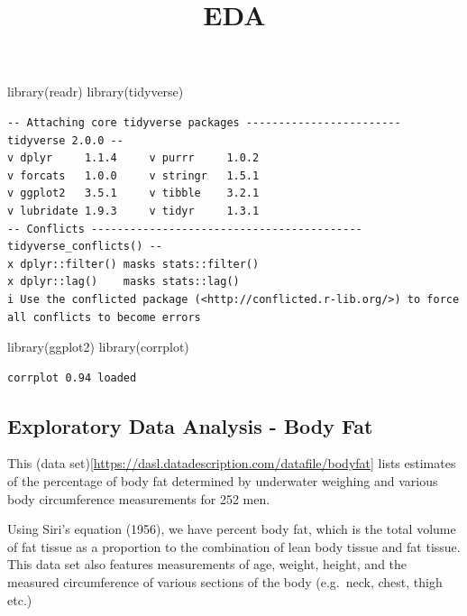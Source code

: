 \documentclass[
  letterpaper,
  DIV=11,
  numbers=noendperiod]{scrartcl}
\title{EDA}
\author{}
\date{}
\newenvironment{Shaded}{\begin{snugshade}}{\end{snugshade}}
\newcommand{\FunctionTok}[1]{\textcolor[rgb]{0.28,0.35,0.67}{#1}}
\newcommand{\NormalTok}[1]{\textcolor[rgb]{0.00,0.23,0.31}{#1}}
\begin{document}
\maketitle

\begin{Shaded}
\begin{Highlighting}[]
\FunctionTok{library}\NormalTok{(readr)}
\FunctionTok{library}\NormalTok{(tidyverse)}
\end{Highlighting}
\end{Shaded}

\begin{verbatim}
-- Attaching core tidyverse packages ------------------------ tidyverse 2.0.0 --
v dplyr     1.1.4     v purrr     1.0.2
v forcats   1.0.0     v stringr   1.5.1
v ggplot2   3.5.1     v tibble    3.2.1
v lubridate 1.9.3     v tidyr     1.3.1
-- Conflicts ------------------------------------------ tidyverse_conflicts() --
x dplyr::filter() masks stats::filter()
x dplyr::lag()    masks stats::lag()
i Use the conflicted package (<http://conflicted.r-lib.org/>) to force all conflicts to become errors
\end{verbatim}

\begin{Shaded}
\begin{Highlighting}[]
\FunctionTok{library}\NormalTok{(ggplot2)}
\FunctionTok{library}\NormalTok{(corrplot)}
\end{Highlighting}
\end{Shaded}

\begin{verbatim}
corrplot 0.94 loaded
\end{verbatim}

\subsection{Exploratory Data Analysis - Body
Fat}\label{exploratory-data-analysis---body-fat}

This (data
set){[}\url{https://dasl.datadescription.com/datafile/bodyfat}{]} lists
estimates of the percentage of body fat determined by underwater
weighing and various body circumference measurements for 252 men.

Using Siri's equation (1956), we have percent body fat, which is the
total volume of fat tissue as a proportion to the combination of lean
body tissue and fat tissue. This data set also features measurements of
age, weight, height, and the measured circumference of various sections
of the body (e.g.~neck, chest, thigh etc.)
\end{document}
